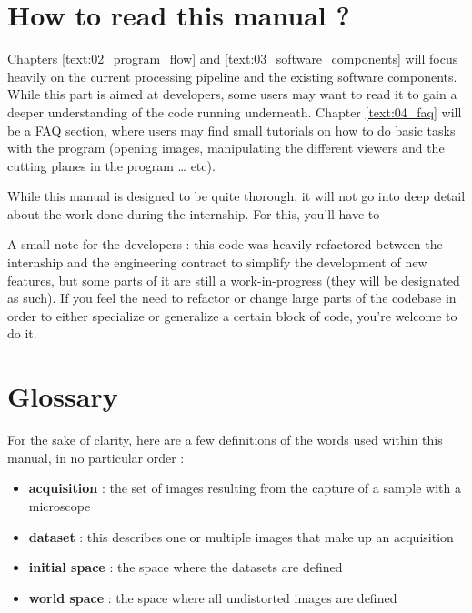 \section{How to read this manual ?}\label{text:01_intro:02_howtoread}
{

	Chapters \ref{text:02_program_flow} and \ref{text:03_software_components} will focus heavily on the current processing pipeline and the existing software components. While this part is aimed at developers, some users may want to read it to gain a deeper understanding of the code running underneath.
	Chapter \ref{text:04_faq} will be a FAQ section, where users may find small tutorials on how to do basic tasks with the program (opening images, manipulating the different viewers and the cutting planes in the program \ldots{} etc).\par
	While this manual is designed to be quite thorough, it will not go into deep detail about the work done during the internship. For this, you'll have to 

	\vspace{\baselineskip}

	A small note for the developers : this code was heavily refactored between the internship and the engineering contract to simplify the development of new features, but some parts of it are still a work-in-progress (they will be designated as such). If you feel the need to refactor or change large parts of the codebase in order to either specialize or generalize a certain block of code, you're welcome to do it.
}

\section{Glossary}\label{text:01_intro:03_definitions}
{
	For the sake of clarity, here are a few definitions of the words used within this manual, in no particular order :

	\begin{itemize}
		\item \textbf{acquisition} : the set of images resulting from the capture of a sample with a microscope
		\item \textbf{dataset} : this describes one or multiple images that make up an acquisition
		\item \textbf{initial space} : the space where the datasets are defined
		\item \textbf{world space} : the space where all undistorted images are defined
	\end{itemize}
}


